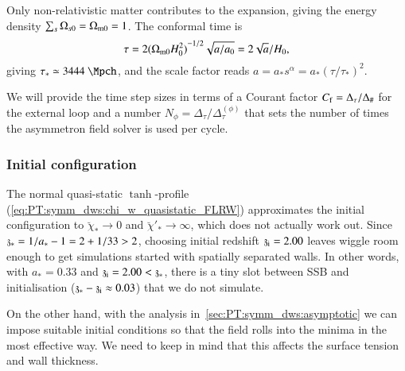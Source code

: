     Only non-relativistic matter contributes to the expansion, giving the energy density  $\sum_{s} \Omega_{s0}=\Omega_\mathrm{m0}=1$. The conformal time is
    \begin{equation}
        \tau = 2 {(\Omega_\mathrm{m0}H_0^2)}^{-1/2} \sqrt{a/a_0} = {2 \sqrt{a}}/{H_0},
    \end{equation}
    giving $\tau_\ast \simeq 3444~\Mpch$, and the scale factor reads $a=a_\ast s^\alpha = a_\ast {(\tau/\tau_\ast)}^2$.

    We will provide the time step sizes %
    in terms of a Courant factor $C_\mathrm{f}=\Delta_\tau/\Delta_\#$ for the external loop and a number $N_\phi=\Delta_\tau/\Delta_\tau^{(\phi)}$ that sets the number of times the asymmetron field solver is used per cycle. %

\subsubsection{Initial configuration}

    The normal quasi-static $\tanh$-profile (\cref{eq:PT:symm_dws:chi_w_quasistatic_FLRW}) approximates the initial configuration to $\breve{\chi}_\ast\to0$ and $\breve{\chi}'_\ast \to \infty$, which does not actually work out. %
    Since $\mathfrak{z}_\ast=1/a_\ast-1 = 2 + 1/33 > 2$, choosing initial redshift $\mathfrak{z}_\mathrm{i}=2.00$ leaves wiggle room enough to get simulations started with spatially separated walls. In other words, with $a_\ast=0.33$ and $\mathfrak{z}_\mathrm{i}=2.00< \mathfrak{z}_\ast$, there is a tiny slot between SSB and initialisation ($\mathfrak{z}_\ast-\mathfrak{z}_\mathrm{i} \approx 0.03$) that we do not simulate.
    
    On the other hand, with the analysis in~\cref{sec:PT:symm_dws:asymptotic} we can impose suitable initial conditions so that the field rolls into the minima in the most effective way. We need to keep in mind that this affects the surface tension and wall thickness.



